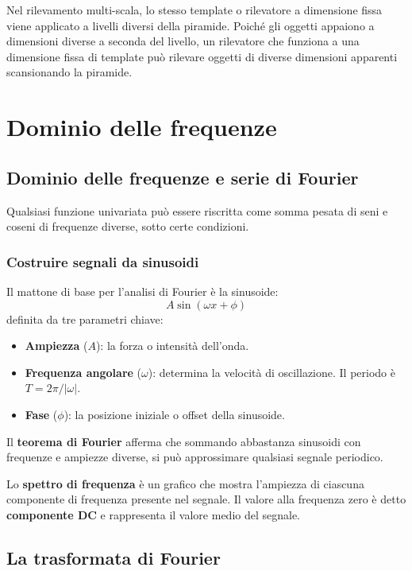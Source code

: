 \documentclass[12pt, a4paper]{report}
\begin{document}
Nel rilevamento multi-scala, lo stesso template o rilevatore a dimensione fissa
viene applicato a livelli diversi della piramide.  Poiché gli oggetti appaiono a
dimensioni diverse a seconda del livello, un rilevatore che funziona a una dimensione
fissa di template può rilevare oggetti di diverse dimensioni apparenti scansionando
la piramide.

\chapter{Dominio delle frequenze}

\section{Dominio delle frequenze e serie di Fourier}

Qualsiasi funzione univariata può essere riscritta come somma pesata di seni e coseni
di frequenze diverse, sotto certe condizioni.

\subsection{Costruire segnali da sinusoidi}

Il mattone di base per l'analisi di Fourier è la sinusoide:
\[
  A\sin(\omega x + \phi)
\]
definita da tre parametri chiave:
\begin{itemize}
  \item \textbf{Ampiezza} ($A$): la forza o intensità dell'onda.
  \item \textbf{Frequenza angolare} ($\omega$): determina la velocità di oscillazione.
        Il periodo è $T = 2\pi/|\omega|$.
  \item \textbf{Fase} ($\phi$): la posizione iniziale o offset della sinusoide.
\end{itemize}

Il \textbf{teorema di Fourier} afferma che sommando abbastanza sinusoidi con
frequenze e ampiezze diverse, si può approssimare qualsiasi segnale periodico.

Lo \textbf{spettro di frequenza} è un grafico che mostra l'ampiezza di ciascuna
componente di frequenza presente nel segnale.  Il valore alla frequenza zero è detto
\textbf{componente DC} e rappresenta il valore medio del segnale.

\section{La trasformata di Fourier}
\end{document}
